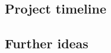 \documentclass{easychair}
\begin{document}
\subsection{Project timeline}


\subsection{Further ideas}




%
\label{sect:bib}

%
%
%



\end{document}
